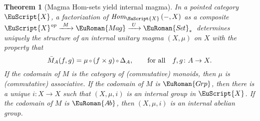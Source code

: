 \documentclass [12pt,oneside]{book}%
\theoremstyle{captionstyle}  %
\newtheorem{theorem}[subsection]{Theorem}
\newcommand{\XRA}[1]{\xrightarrow{\ #1\ }}
\newcommand{\from}{\colon}				%
\newcommand{\Comp}{\raisebox{0.1ex}{\ensuremath{\,\scriptstyle{\circ}}\,}}
\newcommand{\DgnlOn}[1]{\Delta_{#1}}	%
\newcommand{\HomIn}[3]{\textit{Hom}_{#1}\left(#2,#3\right)}
\newcommand{\SetsBsd}{\EuRoman{S{\kern-0.12ex}e{\hskip-0.14ex}t}_{\ast}\,}	%
\newcommand{\Magmas}{\EuRoman{M{\kern -.12ex}a{\kern -.15ex}g}}			%
\newcommand{\Grps}{\EuRoman{G{\kern -.15ex}rp}}				%
\newcommand{\AbGrps}{\EuRoman{A{\kern-0.15ex}b}}	%
\newcommand{\op}{\ensuremath{\mathit{op}}}
\newcommand{\Ctgry}[1]{\EuScript{#1}}					%
\newcommand{\Prdct}[2]{#1 \times #2}	 	%
\begin{document}
\begin{theorem}[Magma Hom-sets yield internal magma]
    \label{thm:MagmaHom-sets->InternalMagma}
    In a pointed category $\Ctgry{X} $, a factorization of $\HomIn{\Ctgry{X} }{-}{X}$ as a composite $ \Ctgry{X} ^{\op}\XRA{M} \Magmas \XRA{U} \SetsBsd$ determines uniquely the structure of an internal unitary magma $(X,\mu)$ on $X$ with the property that
    \begin{equation*}
        \bar{M}_A(f,g) = \mu\Comp (\Prdct{f}{g}) \Comp \DgnlOn{A},\qquad \text{for all}\quad f,g\from A\to X.
    \end{equation*}
    If the codomain of $M$ is the category of (commutative) monoids, then $\mu$ is (commutative) associative. If the codomain of $M$ is $\Grps$, then there is a unique $i\from X\to X$ such that $(X,\mu,i)$ is an internal group in $\Ctgry{X} $. If the codomain of $M$ is $\AbGrps$, then $(X,\mu,i)$ is an internal abelian group.
\end{theorem}
\end{document}
